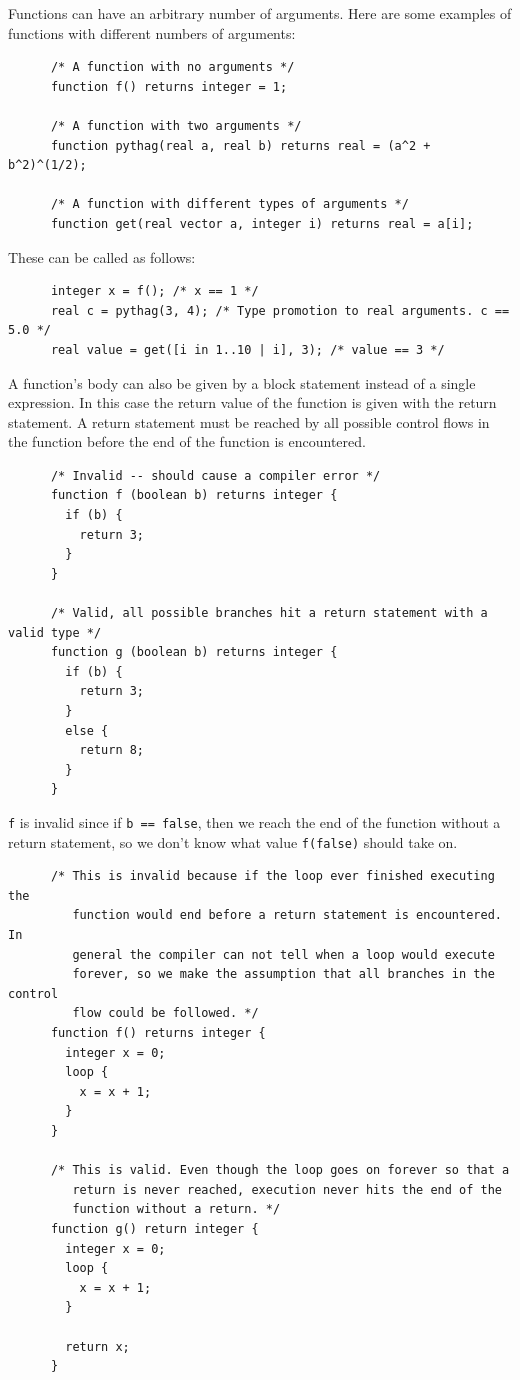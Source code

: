 \documentclass{article}
\begin{document}
    Functions can have an arbitrary number of arguments. Here are some examples of functions with different numbers
    of arguments:

    \begin{lstlisting}
      /* A function with no arguments */
      function f() returns integer = 1;

      /* A function with two arguments */
      function pythag(real a, real b) returns real = (a^2 + b^2)^(1/2);

      /* A function with different types of arguments */
      function get(real vector a, integer i) returns real = a[i];
    \end{lstlisting}

    These can be called as follows:

    \begin{lstlisting}
      integer x = f(); /* x == 1 */
      real c = pythag(3, 4); /* Type promotion to real arguments. c == 5.0 */
      real value = get([i in 1..10 | i], 3); /* value == 3 */
    \end{lstlisting}

    A function's body can also be given by a block statement instead of a single expression. In this case the return
    value of the function is given with the return statement. A return statement must be reached by all possible
    control flows in the function before the end of the function is encountered.

    \begin{lstlisting}
      /* Invalid -- should cause a compiler error */
      function f (boolean b) returns integer {
        if (b) {
          return 3;
        }
      }

      /* Valid, all possible branches hit a return statement with a valid type */
      function g (boolean b) returns integer {
        if (b) {
          return 3;
        }
        else {
          return 8;
        }
      }
    \end{lstlisting}

    \texttt{f} is invalid since if \texttt{b == false}, then we reach the end of the function without a return
    statement, so we don't know what value \texttt{f(false)} should take on.

    \begin{lstlisting}
      /* This is invalid because if the loop ever finished executing the
         function would end before a return statement is encountered. In
         general the compiler can not tell when a loop would execute
         forever, so we make the assumption that all branches in the control
         flow could be followed. */
      function f() returns integer {
        integer x = 0;
        loop {
          x = x + 1;
        }
      }

      /* This is valid. Even though the loop goes on forever so that a
         return is never reached, execution never hits the end of the
         function without a return. */
      function g() return integer {
        integer x = 0;
        loop {
          x = x + 1;
        }

        return x;
      }
    \end{lstlisting}
\end{document}

